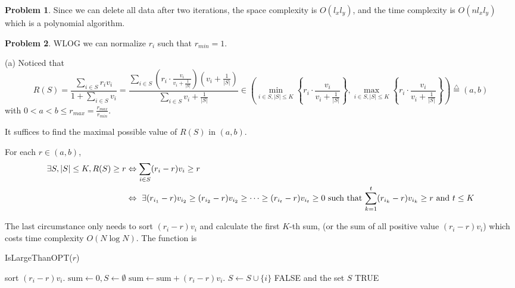 \documentclass[a4paper]{article}
\theoremstyle{definition}
\newtheorem{problem}{Problem}
\theoremstyle{plain}
\newcommand{\dps}{\displaystyle}
\numberwithin{equation}{problem}
\begin{document}
\begin{problem}
    Since we can delete all data after two iterations, the space complexity is  $ O(l_xl_y) $, and the time complexity is  $ O(nl_xl_y) $  which is a polynomial algorithm. 
\end{problem}

\begin{problem}
    WLOG we can normalize  $ r_i $ such that  $ r_{min}=1 $.

    (a) Noticed that 
    \[R(S)=\frac{\sum_{i\in S}r_iv_i}{1+\sum_{i\in S}v_i}=\frac{\sum_{i\in S}(r_i\cdot\frac{v_i}{v_i+\frac{1}{|S|}})(v_i+\frac{1}{|S|})}{\sum_{i\in S}v_i+\frac{1}{|S|}} \in\left( \min_{i\in S,|S| \leq K}\left\{r_i\cdot\frac{v_i}{v_i+\frac{1}{|S|}}\right\}, \max_{i\in S,|S| \leq K}\left\{r_i\cdot\frac{v_i}{v_i+\frac{1}{|S|}}\right\}\right)\overset{\triangle }{=}(a,b)\]
    with  $ 0<a<b \leq r_{max}=\frac{r_{max}}{r_{min}} $. 

    It suffices to find the maximal possible value of  $ R(S) $ in  $ (a,b) $.  

    For each  $ r\in (a,b) $, 
    \begin{align}
        \exists S,|S| \leq K,R(S) \geq r&\Leftrightarrow\sum_{i\in S}(r_i-r)v_i \geq r\notag\\
        &\Leftrightarrow \text{  $ \exists(r_{i_1}-r)v_{i_2} \geq (r_{i_2}-r)v_{i_2} \geq \cdots \geq (r_{i_t}-r)v_{i_t} \geq 0 $ such that  $ \dps\sum_{k=1}^t (r_{i_k}-r)v_{i_k} \geq r $ and  $ t \leq K $} \label{eq2}
    \end{align}


    The last circumstance only needs to sort  $ (r_i-r)v_i $ and calculate the first  $ K $-th  sum, (or the sum of  all positive value $ (r_i-r)v_i $) which costs time complexity  $ O(N\log N) $. The function is 
    \begin{algorithm}
        \caption{IsLargeThanOPT($r$)}
        \label{alg1}
        \begin{algorithmic}
            \STATE sort  $ (r_i-r)v_i $.
            \STATE  $ \mathrm{sum}\leftarrow0 , S\leftarrow\emptyset$ 
                    \STATE  $ \mathrm{sum}\leftarrow\mathrm{sum}+(r_i-r)v_i $.
                    \STATE  $ S\leftarrow S\cup\{i\} $
                \ENDIF
            \ENDFOR
                \RETURN FALSE and the set  $ S $
            \ELSE \RETURN TRUE
            \ENDIF 
        \end{algorithmic}
    \end{algorithm}
    

\end{problem}
\end{document}
